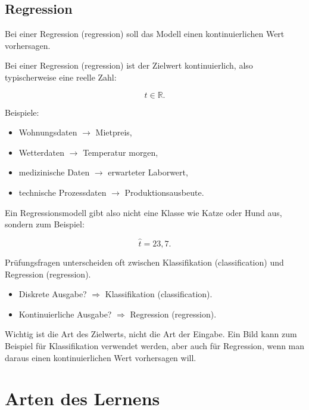 \subsection{Regression}

Bei einer Regression (regression) soll das Modell einen kontinuierlichen Wert vorhersagen.

\begin{definitionbox}
Bei einer Regression (regression) ist der Zielwert kontinuierlich, also typischerweise eine reelle Zahl:

\[
    t \in \mathbb{R}.
\]
\end{definitionbox}

Beispiele:

\begin{itemize}
    \item Wohnungsdaten \(\rightarrow\) Mietpreis,
    \item Wetterdaten \(\rightarrow\) Temperatur morgen,
    \item medizinische Daten \(\rightarrow\) erwarteter Laborwert,
    \item technische Prozessdaten \(\rightarrow\) Produktionsausbeute.
\end{itemize}

Ein Regressionsmodell gibt also nicht eine Klasse wie Katze oder Hund aus, sondern zum Beispiel:

\[
    \hat{t} = 23{,}7.
\]

\begin{examtipbox}
Prüfungsfragen unterscheiden oft zwischen Klassifikation (classification) und Regression (regression).

\begin{itemize}
    \item Diskrete Ausgabe? \(\Rightarrow\) Klassifikation (classification).
    \item Kontinuierliche Ausgabe? \(\Rightarrow\) Regression (regression).
\end{itemize}

Wichtig ist die Art des Zielwerts, nicht die Art der Eingabe.
Ein Bild kann zum Beispiel für Klassifikation verwendet werden, aber auch für Regression, wenn man daraus einen kontinuierlichen Wert vorhersagen will.
\end{examtipbox}

\section{Arten des Lernens}

